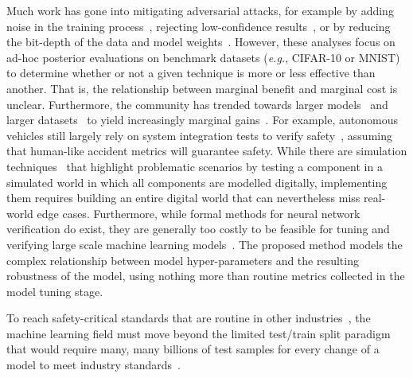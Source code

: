 Much work has gone into mitigating adversarial attacks, for example by adding noise in the training process~\cite{gauss_aug,gauss_out}, rejecting low-confidence results~\cite{high_conf}, or by reducing the bit-depth of the data and model weights~\cite{feature_squeezing}. However, these analyses focus on ad-hoc posterior evaluations on benchmark datasets (\textit{e.g.}, CIFAR-10 or MNIST) to determine whether or not a given technique is more or less effective than another. That is, the relationship between marginal benefit and marginal cost is unclear. Furthermore, the community has trended towards larger models~\cite{desislavov2021compute} and larger datasets~\cite{desislavov2021compute,bailly2022effects} to yield increasingly marginal gains~\cite{sun2017revisiting}. For example, autonomous vehicles still largely rely on system integration tests to verify safety~\cite{vehicle_testing_review}, assuming that human-like accident metrics will guarantee safety. While there are simulation techniques~\cite{vehicle_formal} that highlight problematic scenarios by testing a component in a simulated world in which all components are modelled digitally, implementing them requires building an entire digital world that can nevertheless miss real-world edge cases. Furthermore, while formal methods for neural network verification do exist, they are generally too costly to be feasible for tuning and verifying large scale machine learning models~\cite{formal_adversarial}. The proposed method models the complex relationship between model hyper-parameters and the resulting robustness of the model, using nothing more than routine metrics collected in the model tuning stage.

To reach safety-critical standards that are routine in other industries~\cite{iso26262,IEC61508,IEC62034}, the machine learning field must move beyond the limited test/train split paradigm that would require many, many billions of test samples for every change of a model to meet industry standards~\cite{meyers}.



